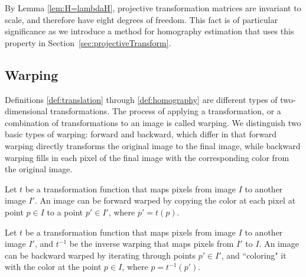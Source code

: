 \documentclass[11pt, oneside, reqno]{book}
\begin{document}
By Lemma \ref{lem:H=lambdaH}, projective transformation matrices are invariant to scale, and therefore have eight degrees of freedom. This fact is of particular significance as we introduce a method for homography estimation that uses this property in Section~\ref{sec:projectiveTransform}. 












\subsection{Warping}
\label{ssec:warping}

Definitions \ref{def:translation} through \ref{def:homography} are different types of two-dimensional transformations. The process of applying a transformation, or a combination of transformations to an image is called warping. We distinguish two basic types of warping: forward and backward, which differ in that forward warping directly transforms the original image to the final image, while backward warping fills in each pixel of the final image with the corresponding color from the original image.

\begin{definition}  
	\label{def:forwarp}
	Let $t$ be a transformation function that maps pixels from image $I$ to another image $I'$. An image can be forward warped by copying the color at each pixel at point $p \in I$ to a point $p' \in I'$, where $p' = t(p)$.
\end{definition}

\begin{definition}  
	\label{def:backwarp}
	Let $t$ be a transformation function that maps pixels from image $I$ to another image $I'$, and $t^{-1}$ be the inverse warping that maps pixels from $I'$ to $I$. An image can be backward warped by iterating through points $p' \in I'$, and ``coloring" it with the color at the point $p \in I$, where $p = t^{-1}(p')$. 
	
\end{definition}

\end{document}
